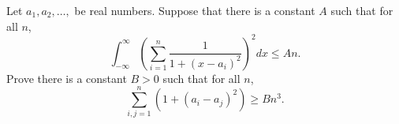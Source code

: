 Let $a_1,a_2,\ldots,$ be real numbers. Suppose that there is a constant $A$ such that for all $n$,
\[
	\int_{-\infty}^{\infty} \left( \sum_{i=1}^n \frac{1}{1+(x-a_i)^2} \right)^2 dx \leq An.
\]
Prove there is a constant $B>0$ such that for all $n$,
\[
	\sum_{i,j=1}^n (1+(a_i-a_j)^2) \geq Bn^3.
\]